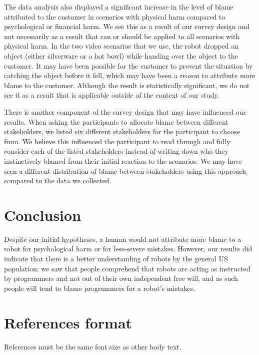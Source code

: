 \documentclass{sigchi}
\begin{document}
The data analysis also displayed a significant increase in the level of blame attributed to the customer in scenarios with physical harm compared to psychological or financial harm. We see this as a result of our survey design and not necessarily as a result that can or should be applied to all scenarios with physical harm. In the two video scenarios that we use, the robot dropped an object (either silverware or a hot bowl) while handing over the object to the customer. It may have been possible for the customer to prevent the situation by catching the object before it fell, which may have been a reason to attribute more blame to the customer. Although the result is statistically significant, we do not see it as a result that is applicable outside of the context of our study.

There is another component of the survey design that may have influenced our results. When asking the participants to allocate blame between different stakeholders, we listed six different stakeholders for the participant to choose from. We believe this influenced the participant to read through and fully consider each of the listed stakeholders instead of writing down who they instinctively blamed from their initial reaction to the scenarios. We may have seen a different distribution of blame between stakeholders using this approach compared to the data we collected.

\section{Conclusion}
Despite our initial hypotheses, a human would not attribute more blame to a robot for psychological harm or for less-severe mistakes. However, our results did indicate that there is a better understanding of robots by the general US population: we saw that people comprehend that robots are acting as instructed by programmers and not out of their own independent free will, and as such people will tend to blame programmers for a robot's mistakes.

\section{References format}
References must be the same font size as other body text.


\end{document}
